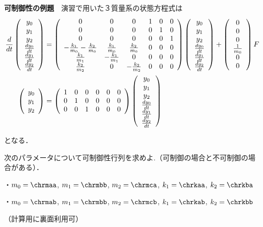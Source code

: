 \noindent
{\bf 可制御性の例題}　演習で用いた３質量系の状態方程式は
\begin{align}
 \frac{d}{dt} \left(\begin{array}{c} y_0 \\ y_1 \\ y_2 \\ \frac{dy_0}{dt} \\ \frac{dy_1}{dt} \\ \frac{dy_2}{dt} \end{array}\right)
 &=
 \left(\begin{array}{cccccc}
        0 & 0 & 0 & 1 & 0 & 0      \\
        0 & 0 & 0 & 0 & 1 & 0      \\
        0 & 0 & 0 & 0 & 0 & 1      \\
	-\frac{k_1}{m_0} -\frac{k_2}{m_0}&  \frac{k_1}{m_0} &  \frac{k_2}{m_0} & 0 & 0 & 0 \\
	 \frac{k_1}{m_1}                & -\frac{k_1}{m_1} &  0               & 0 & 0 & 0 \\
	 \frac{k_2}{m_2}                &  0               & -\frac{k_2}{m_2} & 0 & 0 & 0 
       \end{array}\right)
 \left(\begin{array}{c} y_0 \\ y_1 \\ y_2 \\ \frac{dy_0}{dt} \\ \frac{dy_1}{dt} \\ \frac{dy_2}{dt} \end{array}\right)
 +
 \left(\begin{array}{c}
        0 \\
        0 \\
        0 \\
	    \frac{1}{m_0} \\
	    0 \\
	    0 
       \end{array}\right)
        F
\nonumber
\\
 \left(\begin{array}{c}
	    y_0 \\
		y_1 \\
		y_2
       \end{array}\right)
 &=
 \left(\begin{array}{cccccc}
         1 & 0 & 0 & 0 & 0 & 0  \\
         0 & 1 & 0 & 0 & 0 & 0 \\
         0 & 0 & 1 & 0 & 0 & 0 \\
       \end{array}\right)
 \left(\begin{array}{c} y_0 \\ y_1 \\ y_2 \\ \frac{dy_0}{dt} \\ \frac{dy_1}{dt} \\ \frac{dy_2}{dt} \end{array}\right)
\nonumber
\end{align}
\vspace*{-1cm}

となる．

次のパラメータについて可制御性行列を求めよ.（可制御の場合と不可制御の場合がある）．

・$m_0=\chrmaa$, $m_1=\chrmbb$, $m_2=\chrmca$, $k_1=\chrkaa$, $k_2=\chrkba$

・$m_0=\chrmab$, $m_1=\chrmbb$, $m_2=\chrmcb$, $k_1=\chrkab$, $k_2=\chrkbb$

（計算用に裏面利用可）

\vfill

